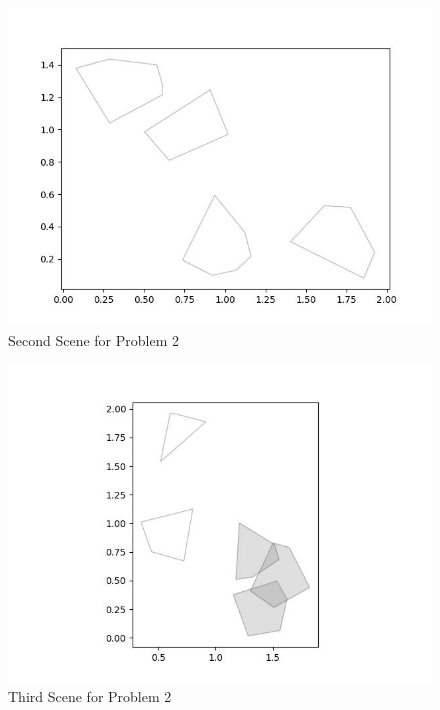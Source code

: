 \documentclass{article}
\begin{document}
\begin{figure}[h!]
	\includegraphics[width= 0.9 \linewidth]{Problem2_scene2.jpg}
	\centering
	\caption{Second Scene for Problem 2}
	\label{Problem2_scene2.jpg}
\end{figure}

\begin{figure}[h!]
	\includegraphics[width= 0.9 \linewidth]{Problem2_scene3.jpg}
	\centering
	\caption{Third Scene for Problem 2}
	\label{Problem2_scene3.jpg}
\end{figure}
\end{document}
